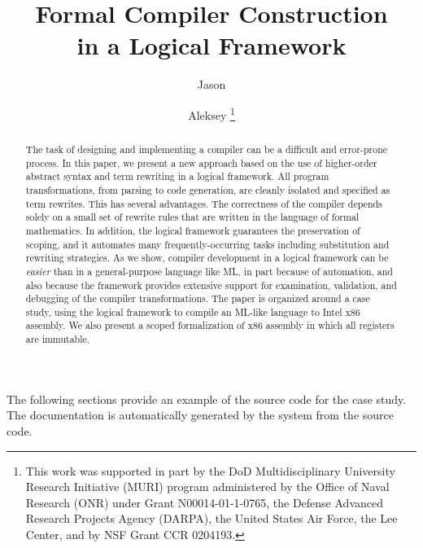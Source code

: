 \documentclass[numreferences]{kluwer}
\begin{document}
\begin{article}
\begin{opening}

\title{Formal Compiler Construction\\ in a Logical Framework}

\author{Jason \footnotemark\addtocounter{footnote}{-1}}
\author{Aleksey \thanks{This
  work was supported in part by the DoD Multidisciplinary
  University Research Initiative (MURI) program administered by the
  Office of Naval Research (ONR) under Grant N00014-01-1-0765, the
  Defense Advanced Research Projects Agency (DARPA), the United States
  Air Force, the Lee Center, and by NSF Grant CCR 0204193.}}


\begin{abstract}
The task of designing and implementing a compiler can be a
difficult and error-prone process.  In this paper, we present a new
approach based on the use of higher-order abstract syntax and term
rewriting in a logical framework.  All program transformations, from
parsing to code generation, are cleanly isolated and specified as term
rewrites.  This has several advantages.  The correctness of the
compiler depends solely on a small set of rewrite rules that are
written in the language of formal mathematics.  In addition, the logical
framework guarantees the preservation of scoping, and it automates
many frequently-occurring tasks including substitution and rewriting
strategies.  As we show, compiler development in a logical framework
can be \emph{easier} than in a general-purpose language like ML, in
part because of automation, and also because the framework provides
extensive support for examination, validation, and debugging of the
compiler transformations.  The paper is organized around a case study,
using the \MetaPRL{} logical framework to compile an ML-like language to
Intel x86 assembly.  We also present a scoped formalization of x86
assembly in which all registers are immutable.

\end{abstract}
\end{opening}
\renewcommand\floatpagefraction{1.0}






\appendix

The following sections provide an example of the source code for the
case study.  The documentation is automatically generated by the
\MetaPRL{} system from the source code.



\end{article}
\end{document}
